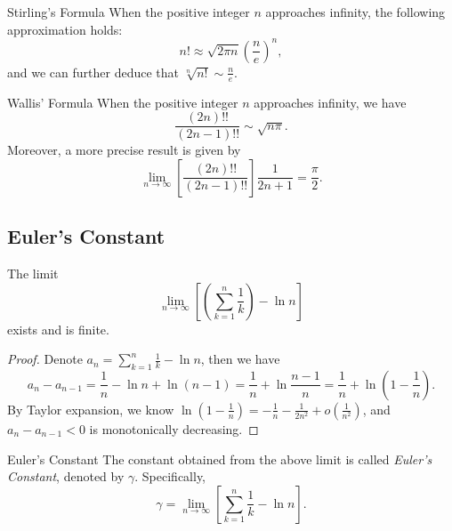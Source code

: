 \begin{theorem}{Stirling's Formula}{}
  When the positive integer $n$ approaches infinity,
  the following approximation holds:
  \begin{equation}
    n! \approx \sqrt{2\pi n} \left( \frac{n}{e} \right)^n,
  \end{equation}
  and we can further deduce that $\sqrt[n]{n!} \sim \frac{n}{e}$.
\end{theorem}

\begin{theorem}{Wallis' Formula}{}
  When the positive integer $n$ approaches infinity,
  we have
  \begin{equation}
    \frac{(2n)!!}{(2n - 1)!!} \sim \sqrt{n \pi}.
  \end{equation}
  Moreover, a more precise result is given by
  \begin{equation}
    \lim \limits _{n \rightarrow \infty} \left[
      \frac{(2n)!!}{(2n - 1)!!}
    \right]\frac{1}{2n+1} = \frac{\pi}{2}.
  \end{equation}
\end{theorem}

\subsection{Euler's Constant}

\begin{lemma}{}{}
  The limit
  \begin{equation}
    \lim \limits _{n \rightarrow \infty}
  \left[ (\sum\limits_{k = 1}^n \frac{1}{k}) - \ln n \right]
  \end{equation}
  exists and is finite.
\end{lemma}

\begin{proof}
  Denote $a_n = \sum\limits_{k = 1}^n \frac{1}{k} - \ln n$,
  then we have
  \begin{equation}
    a_n - a_{n-1} = \frac{1}{n} - \ln n + \ln (n-1) = \frac{1}{n} + \ln \frac{n-1}{n} = \frac{1}{n} + \ln (1 - \frac{1}{n}).
  \end{equation}
  By Taylor expansion, we know $\ln (1 - \frac{1}{n}) = - \frac{1}{n} -
  \frac{1}{2n^2} + o(\frac{1}{n^2})$,
  and $a_n - a_{n-1} < 0$ is monotonically decreasing.
\end{proof}

\begin{definition}{Euler's Constant}{}
  The constant obtained from the above limit is called \emph{Euler's Constant},
  denoted by $\gamma$. Specifically,
  \begin{equation}
    \gamma = \lim \limits _{n \rightarrow \infty} \left[ \sum\limits_{k = 1}^n \frac{1}{k} - \ln n \right].
  \end{equation}
\end{definition}

